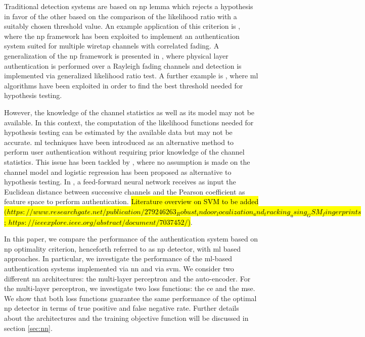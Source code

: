 \documentclass[draftcls,onecolumn,12pt]{IEEEtran}
\begin{document}
Traditional detection systems are based on \ac{np} lemma which rejects a hypothesis in favor of the other based on the comparison of the likelihood ratio with a suitably chosen threshold value. An example application of this criterion is \cite{Baracca-12}, where the \ac{np} framework has been exploited to implement an authentication system suited for multiple wiretap channels with correlated fading. A generalization of the \ac{np} framework is presented in \cite{Xiao-09}, where physical layer authentication is performed over a Rayleigh fading channels and detection is implemented via generalized likelihood ratio test. A further example is \cite{Pan-17}, where \ac{ml} algorithms have been exploited in order to find the best threshold needed for hypothesis testing.

However, the knowledge of the channel statistics as well as its model may not be available. In this context, the computation of the likelihood functions needed for hypothesis testing can be estimated by the available data but may not be accurate. \ac{ml} techniques have been introduced as an alternative method to perform user authentication without requiring prior knowledge of the channel statistics. This issue has been tackled by \cite{xiao-2018}, where no assumption is made on the channel model and logistic regression has been proposed as alternative to hypothesis testing. In \cite{Wang-17}, a feed-forward neural network receives as input the Euclidean distance between successive channels and the Pearson coefficient as feature space to perform authentication. 
%
 \hl{Literature overview on SVM to be added $(https://www.researchgate.net/publication/279246263_Robust_indoor_localization_and_tracking_using_GSM_fingerprints$
; $https://ieeexplore.ieee.org/abstract/document/7037452/$)}.

In this paper, we compare the performance of the authentication system based on \ac{np} optimality criterion, henceforth referred to as \ac{np} detector, with \ac{ml} based approaches. In particular, we investigate the performance of the \ac{ml}-based authentication systems implemented via \ac{nn} and via \ac{svm}. We consider two different \ac{nn} architectures: the multi-layer perceptron and the auto-encoder. For the multi-layer perceptron, we investigate two loss functions: the \ac{ce} and the \ac{mse}. We show that both loss functions guarantee the same performance of the optimal \ac{np} detector in terms of true positive and false negative rate. Further details about the architectures and the training objective function will be discussed in section \ref{sec:nn}.
\end{document}
